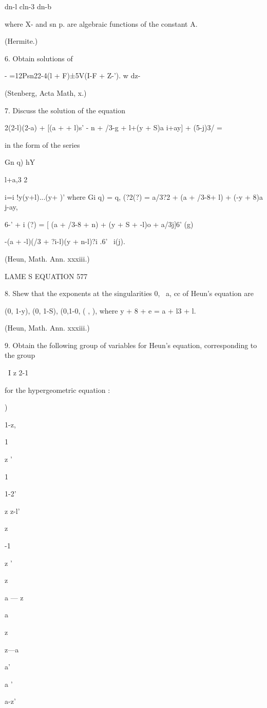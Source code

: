{{{{{{{{dn-l cln-3 dn-b

where X- and sn p. are algebraic functions of the constant A.

(Hermite.)

6. Obtain solutions of

- =12Psn22-4(l + F)±5V(I-F + Z-'). w dz-

(Stenberg, Acta Math, x.)

7. Discuss the solution of the equation

2(2-l)(2-a) + [(a + + l)s' - n + /3-g + l+(y + S)a i+ay] + (5-j)3/ =

in the form of the series

Gn q) hY

l+a,3 2

i=i !y(y+l)...(y+ )' where Gi q) = q, (?2(?) = a/3?2 + (a + /3-8+ l) +
(-y + 8)a j-ay,

6-' + i (?) = [ (a + /3-8 + n) + (y + S + -l)o + a/3j]6' (g)

-(a + -l)(/3 + ?i-l)(y + n-l)?i .6' \ i(j).

(Heun, Math. Ann. xxxiii.)

LAME S EQUATION 577

8. Shew that the exponents at the singularities 0, \, a, cc of Heun's
equation are

(0, 1-y), (0, 1-S), (0,1-0, ( , ), where y + 8 + e = a + l3 + l.

(Heun, Math. Ann. xxxiii.)

9. Obtain the following group of variables for Heun's equation,
corresponding to the group

\ I z 2-1

for the hypergeometric equation :

 )

1-z,

1

z '

1

1-2'

z z-l'

z

-1

z '

z

a — z

  

a

z

z—a

a'

a '

a-z'

}}}}}}}}
